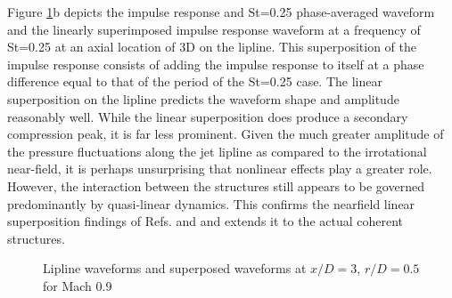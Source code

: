 \documentclass[english]{aiaa-tc}
\begin{document}
Figure \ref{NUM_Phase_AVG_lip}b depicts the impulse response and St=0.25 phase-averaged waveform and the linearly superimposed impulse response waveform at a frequency of St=0.25 at an axial location of 3D on the lipline. This superposition of the impulse response consists of adding the impulse response to itself at a phase difference equal to that of the period of the St=0.25 case. 
The linear superposition on the lipline predicts the waveform shape and amplitude reasonably well. 
While the linear superposition does produce a secondary compression peak, it is far less prominent. Given the much greater amplitude of the pressure fluctuations along the jet lipline as compared to the irrotational near-field, it is perhaps unsurprising that nonlinear effects play a greater role. However, the interaction between the structures still appears to be governed predominantly by quasi-linear dynamics. This confirms the nearfield linear superposition findings of Refs. \cite{sinha2013} and \cite{Crawley2014} and extends it to the actual coherent structures.     
\begin{figure}
	\centering{}\caption{Lipline waveforms and superposed waveforms at $x/D = 3$, $r/D = 0.5$ for Mach 0.9}\label{NUM_Phase_AVG_lip}
\end{figure}
\end{document}
